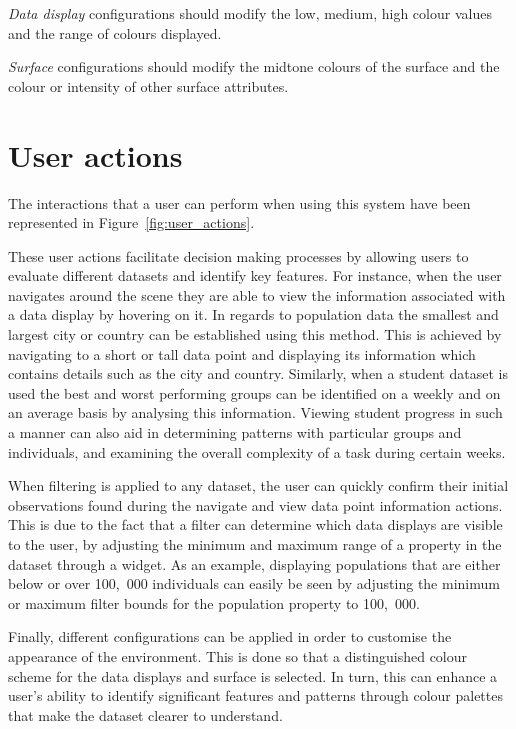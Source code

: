 {{{			\emph{Data display} configurations should modify the low, medium, high colour values and the range of colours displayed.

			\emph{Surface} configurations should modify the midtone colours of the surface and the colour or intensity of other surface attributes.

		}

	}

}

\section{User actions} {
\label{sec:user_actions}

	The interactions that a user can perform when using this system have been represented in Figure~\ref{fig:user_actions}.

	

	These user actions facilitate decision making processes by allowing users to evaluate different datasets and identify key features. For instance, when the user navigates around the scene they are able to view the information associated with a data display by hovering on it. In regards to population data the smallest and largest city or country can be established using this method. This is achieved by navigating to a short or tall data point and displaying its information which contains details such as the city and country. Similarly, when a student dataset is used the best and worst performing groups can be identified on a weekly and on an average basis by analysing this information. Viewing student progress in such a manner can also aid in determining patterns with particular groups and individuals, and examining the overall complexity of a task during certain weeks. 

	When filtering is applied to any dataset, the user can quickly confirm their initial observations found during the navigate and view data point information actions. This is due to the fact that a filter can determine which data displays are visible to the user, by adjusting the minimum and maximum range of a property in the dataset through a widget. As an example, displaying populations that are either below or over 100,~000 individuals can easily be seen by adjusting the minimum or maximum filter bounds for the population property to 100,~000.

	Finally, different configurations can be applied in order to customise the appearance of the environment. This is done so that a distinguished colour scheme for the data displays and surface is selected. In turn, this can enhance a user's ability to identify significant features and patterns through colour palettes that make the dataset clearer to understand.

}

